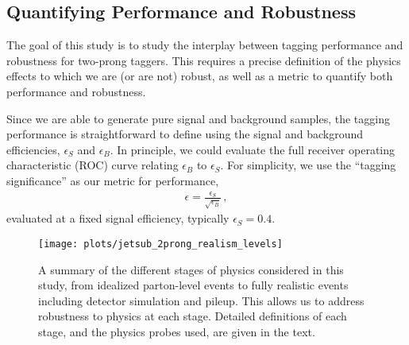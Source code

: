 \subsection{Quantifying Performance and Robustness}\label{sec:SM_jetsub_2prong:pres}


The goal of this study is to study the interplay between tagging performance and robustness for two-prong taggers.
%
This requires a precise definition of the physics effects to which we are (or are not) robust, as well as a metric to quantify both performance and robustness.


Since we are able to generate pure signal and background samples, the tagging performance is straightforward to define using the signal and background efficiencies, $\epsilon_S$ and $\epsilon_B$.
%
In principle, we could evaluate the full receiver operating characteristic (ROC) curve relating $\epsilon_B$ to $\epsilon_S$.
%
For simplicity, we use the ``tagging significance'' as our metric for performance,
\begin{align}\label{eq:SM_jetsub_2prong:significance}
\epsilon=\frac{\epsilon_S}{\sqrt{\epsilon_B}}\,,
\end{align}
evaluated at a fixed signal efficiency, typically $\epsilon_S = 0.4$.

\begin{figure}[t]
\begin{center}
\texttt{[image: plots/jetsub\_2prong\_realism\_levels]}
\end{center}
\caption{A summary of the different stages of physics considered in
  this study, from idealized parton-level events to fully realistic
  events including detector simulation and pileup.
  This allows us to
  address robustness to physics at each stage.
  Detailed definitions of
  each stage, and the physics probes used, are given in the text.
   }
\label{fig:SM_jetsub_2prong:realism}
\end{figure}

